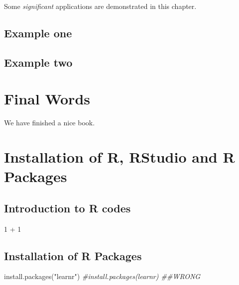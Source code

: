 \documentclass[
]{book}
\newenvironment{Shaded}{\begin{snugshade}}{\end{snugshade}}
\newcommand{\CommentTok}[1]{\textcolor[rgb]{0.56,0.35,0.01}{\textit{#1}}}
\newcommand{\DecValTok}[1]{\textcolor[rgb]{0.00,0.00,0.81}{#1}}
\newcommand{\FunctionTok}[1]{\textcolor[rgb]{0.00,0.00,0.00}{#1}}
\newcommand{\NormalTok}[1]{#1}
\newcommand{\SpecialCharTok}[1]{\textcolor[rgb]{0.00,0.00,0.00}{#1}}
\newcommand{\StringTok}[1]{\textcolor[rgb]{0.31,0.60,0.02}{#1}}
\begin{document}
Some \emph{significant} applications are demonstrated in this chapter.

\hypertarget{example-one}{%
\section{Example one}\label{example-one}}

\hypertarget{example-two}{%
\section{Example two}\label{example-two}}

\hypertarget{final-words}{%
\chapter{Final Words}\label{final-words}}

We have finished a nice book.

\hypertarget{installation-of-r-rstudio-and-r-packages-1}{%
\chapter{Installation of R, RStudio and R Packages}\label{installation-of-r-rstudio-and-r-packages-1}}

\hypertarget{introduction-to-r-codes-1}{%
\section{Introduction to R codes}\label{introduction-to-r-codes-1}}

\begin{Shaded}
\begin{Highlighting}[]
\DecValTok{1} \SpecialCharTok{+} \DecValTok{1}
\end{Highlighting}
\end{Shaded}

\hypertarget{installation-of-r-packages-1}{%
\section{Installation of R Packages}\label{installation-of-r-packages-1}}

\begin{Shaded}
\begin{Highlighting}[]
\FunctionTok{install.packages}\NormalTok{(}\StringTok{"learnr"}\NormalTok{)}
\CommentTok{\#install.packages(learnr) \#\#WRONG}
\end{Highlighting}
\end{Shaded}
\end{document}
